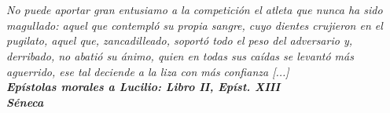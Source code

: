 \chapter*{}

\chapter*{}
\begin{flushright}
	\textit{ No puede aportar gran entusiamo a la competición el atleta que nunca ha sido magullado: aquel que contempl\'{o} su propia sangre, cuyo dientes crujieron en el pugilato, aquel que, zancadilleado, soport\'{o} todo el peso del adversario y, derribado, no abati\'{o} su \'{a}nimo, quien en todas sus ca\'{i}das se levant\'{o} m\'{a}s aguerrido, ese tal deciende a la liza con m\'{a}s confianza [...]}\\
\vspace{1cm}
	\textbf{\textit{Ep\'{i}stolas morales a Lucilio: Libro II, Ep\'{i}st. XIII}\\
	\textit{S\'{e}neca}}\\
\end{flushright}
